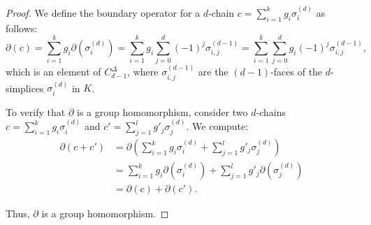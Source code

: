 \begin{proof}
	We define the boundary operator for a $d$-chain $c = \sum_{i=1}^{k}g_{i} \sigma
	_{i}^{(d)}$ as follows:
	\[
		\partial(c) = \sum_{i=1}^{k}g_{i} \partial(\sigma_{i}^{(d)}) = \sum_{i=1}^{k}
		g_{i} \sum_{j=0}^{d}(-1)^{j} \sigma_{i,j}^{(d-1)}= \sum_{i=1}^{k}\sum_{j=0}^{d}
		g_{i} (-1)^{j} \sigma_{i,j}^{(d-1)},
	\]
	which is an element of $C^{\Delta}_{d-1}$, where $\sigma_{i,j}^{(d-1)}$ are the
	$(d-1)$-faces of the $d$-simplices $\sigma_{i}^{(d)}$ in $K$.

	To verify that $\partial$ is a group homomorphism, consider two $d$-chains
	$c = \sum_{i=1}^{k}g_{i} \sigma_{i}^{(d)}$ and
	$c' = \sum_{j=1}^{l}g'_{j} \sigma_{j}^{(d)}$. We compute:
	\begin{align}
		\partial(c + c') & = \partial\left( \sum_{i=1}^{k}g_{i} \sigma_{i}^{(d)}+ \sum_{j=1}^{l}g'_{j} \sigma_{j}^{(d)}\right) \\
		                 & = \sum_{i=1}^{k}g_{i} \partial(\sigma_{i}^{(d)}) + \sum_{j=1}^{l}g'_{j} \partial(\sigma_{j}^{(d)})  \\
		                 & = \partial(c) + \partial(c').
	\end{align}

	Thus, $\partial$ is a group homomorphism.
\end{proof}


